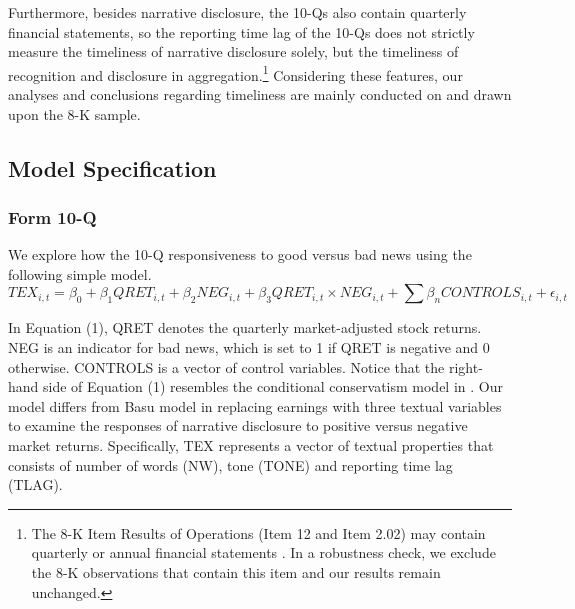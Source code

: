 \documentclass[letterpaper,11pt]{article}
\begin{document}
\begin{spacing}{1.5}
Furthermore, besides narrative disclosure, the 10-Qs also contain quarterly financial statements, so the reporting time lag of the 10-Qs does not strictly measure the timeliness of narrative disclosure solely, but the timeliness of recognition and disclosure in aggregation.\footnote{The 8-K Item Results of Operations (Item 12 and Item 2.02) may contain quarterly or annual financial statements \cite{segalAreManagersStrategic2016}. In a robustness check, we exclude the 8-K observations that contain this item and our results remain unchanged.} Considering these features, our analyses and conclusions regarding timeliness are mainly conducted on and drawn upon the 8-K sample.

\subsection{Model Specification} \label{sec3.3}
\subsubsection{Form 10-Q} \label{sec3.3.1}
\noindent  We explore how the 10-Q responsiveness to good versus bad news using the following simple model. 
\begin{equation} \label{eq1}
TEX_{i,t}=\beta_0+\beta_1QRET_{i,t}+\beta_2NEG_{i,t}+\beta_3QRET_{i,t}\times NEG_{i,t}+\sum\beta_nCONTROLS_{i,t}+\epsilon_{i,t}
\end{equation}

In Equation (1), QRET denotes the quarterly market-adjusted stock returns. NEG is an indicator for bad news, which is set to 1 if QRET is negative and 0 otherwise. CONTROLS is a vector of control variables. Notice that the right-hand side of Equation (1) resembles the conditional conservatism model in . Our model differs from Basu model in replacing earnings with three textual variables to examine the responses of narrative disclosure to positive versus negative market returns. Specifically, TEX represents a vector of textual properties that consists of number of words (NW), tone (TONE) and reporting time lag (TLAG). 


\end{spacing}
\end{document}
